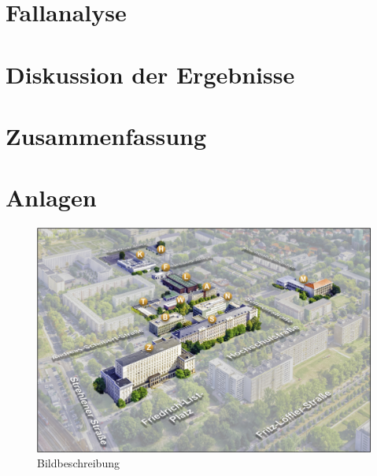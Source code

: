 \documentclass[
 openright,
 a4paper
]{scrreprt}
\begin{document}
\chapter{Fallanalyse}


\chapter{Diskussion der Ergebnisse}

\chapter{Zusammenfassung}

\nocite{*}
\printbibliography
{}

\appendix
\chapter*{Anlagen} \label{Anlagen}
\setcounter{chapter}{1} 

\begin{figure}[!ht]
\centering
\includegraphics[width=\textwidth]{Bilddatei}
\caption{Bildbeschreibung}
\label{fig:Bildlabel}
\end{figure}

\clearpage
\thispagestyle{empty}
\begin{center}
\vfill
\phantom{© \makeatletter\@author\makeatother}
\end{center}
\end{document}
